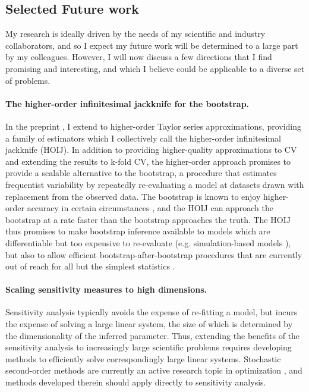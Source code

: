 
\clearpage
\subsection*{Selected Future work}

My research is ideally driven by the needs of my scientific and industry
collaborators, and so I expect my future work will be determined to a large part
by my colleagues.  However, I will now discuss a few directions that I find
promising and interesting, and which I believe could be applicable to a diverse
set of problems.

\paragraph{The higher-order infinitesimal jackknife for the bootstrap.}

In the preprint \citet{giordano:2019:hoij}, I extend \citet{giordano:2019:ij} to
higher-order Taylor series approximations, providing a family of estimators
which I collectively call the higher-order infinitesimal jackknife (HOIJ).  In
addition to providing higher-quality approximations to CV and extending the
results to k-fold CV, the higher-order approach promises to provide a scalable
alternative to the bootstrap, a procedure that estimates frequentist variability
by repeatedly re-evaluating a model at datasets drawn with replacement from the
observed data. The bootstrap is known to enjoy higher-order accuracy in certain
circumstances \citep{hall:2013:bootstrap}, and the HOIJ can approach the
bootstrap at a rate faster than the bootstrap approaches the truth.  The HOIJ
thus promises to make bootstrap inference available to models which are
differentiable but too expensive to re-evaluate (e.g. simulation-based models
\citep[Section 2.6]{baker:2019:workshop}), but also to allow efficient
bootstrap-after-bootstrap procedures that are currently out of reach for
all but the simplest statistics \citep{efron:1994:bootstrap}.


\paragraph{Scaling sensitivity measures to high dimensions.}

Sensitivity analysis typically avoids the expense of re-fitting a model, but
incurs the expense of solving a large linear system, the size of which is
determined by the dimensionality of the inferred parameter.  Thus, extending the
benefits of the sensitivity analysis to increasingly large scientific problems
requires developing methods to efficiently solve correspondingly large linear
systems. Stochastic second-order methods are currently an active research topic
in optimization \citep{agarwal:2017:secondorder, berahas:2020:newtonsketch}, and
methods developed therein should apply directly to sensitivity analysis.

